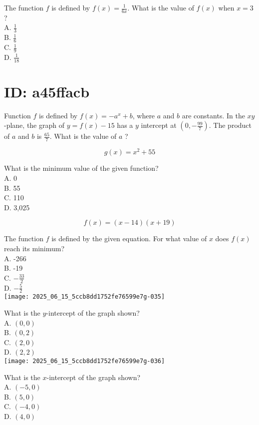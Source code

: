The function $f$ is defined by $f(x)=\frac{1}{6 x}$. What is the value of $f(x)$ when $x=3$ ?\\
A. $\frac{1}{3}$\\
B. $\frac{1}{6}$\\
C. $\frac{1}{9}$\\
D. $\frac{1}{18}$








\section*{ID: a45ffacb}
Function $f$ is defined by $f(x)=-a^{x}+b$, where $a$ and $b$ are constants. 
In the $x y$-plane, the graph of $y=f(x)-15$ has a $y$ intercept at 
$\left(0,-\frac{99}{7}\right)$. The product of $a$ and $b$ is $\frac{65}{7}$. 
What is the value of $a$ ?

$$
g(x)=x^{2}+55
$$

What is the minimum value of the given function?\\
A. 0\\
B. 55\\
C. 110\\
D. 3,025












$$
f(x)=(x-14)(x+19)
$$

The function $f$ is defined by the given equation. For what value of $x$ does $f(x)$ reach its minimum?\\
A. -266\\
B. -19\\
C. $-\frac{33}{2}$\\
D. $-\frac{5}{2}$\\
\texttt{[image: 2025\_06\_15\_5ccb8dd1752fe76599e7g-035]}

What is the $y$-intercept of the graph shown?\\
A. $(0,0)$\\
B. $(0,2)$\\
C. $(2,0)$\\
D. $(2,2)$\\
\texttt{[image: 2025\_06\_15\_5ccb8dd1752fe76599e7g-036]}

What is the $x$-intercept of the graph shown?\\
A. $(-5,0)$\\
B. $(5,0)$\\
C. $(-4,0)$\\
D. $(4,0)$

